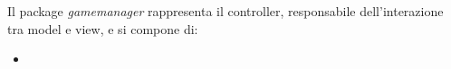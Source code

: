 Il package \textit{gamemanager} rappresenta il controller, responsabile dell'interazione tra model e view, e si compone di:

\begin{itemize}
    \item 
\end{itemize}
